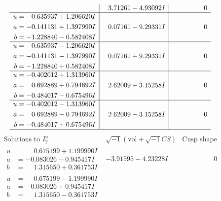\documentclass[1p]{elsarticle_modified}
\theoremstyle{definition}
\newcommand{\I}{\sqrt{-1}}
\begin{document}
$$\begin{array}{c|c|c}
 & \phantom{-}3.71261 - 4.93092 I & \phantom{-0.000000 } 0 \\ \hline\begin{aligned}
u &= \phantom{-}0.635937 + 1.206620 I \\
a &= -0.141131 + 1.397990 I \\
b &= -1.228840 - 0.582408 I\end{aligned}
 & \phantom{-}0.07161 - 9.29331 I & \phantom{-0.000000 } 0 \\ \hline\begin{aligned}
u &= \phantom{-}0.635937 - 1.206620 I \\
a &= -0.141131 - 1.397990 I \\
b &= -1.228840 + 0.582408 I\end{aligned}
 & \phantom{-}0.07161 + 9.29331 I & \phantom{-0.000000 } 0 \\ \hline\begin{aligned}
u &= -0.402012 + 1.313960 I \\
a &= \phantom{-}0.692889 + 0.794692 I \\
b &= -0.484017 - 0.675496 I\end{aligned}
 & \phantom{-}2.62009 + 3.15258 I & \phantom{-0.000000 } 0 \\ \hline\begin{aligned}
u &= -0.402012 - 1.313960 I \\
a &= \phantom{-}0.692889 - 0.794692 I \\
b &= -0.484017 + 0.675496 I\end{aligned}
 & \phantom{-}2.62009 - 3.15258 I & \phantom{-0.000000 } 0\\
 \hline 
 \end{array}$$\newpage$$\begin{array}{c|c|c}  
\text{Solutions to }I^u_{2}& \I (\text{vol} + \sqrt{-1}CS) & \text{Cusp shape}\\
 \hline 
\begin{aligned}
u &= \phantom{-}0.675199 + 1.199990 I \\
a &= -0.083026 - 0.945417 I \\
b &= \phantom{-}1.315650 + 0.361753 I\end{aligned}
 & -3.91595 - 4.23228 I & \phantom{-0.000000 } 0 \\ \hline\begin{aligned}
u &= \phantom{-}0.675199 - 1.199990 I \\
a &= -0.083026 + 0.945417 I \\
b &= \phantom{-}1.315650 - 0.361753 I\end{aligned}

\end{array}$$
\end{document}
